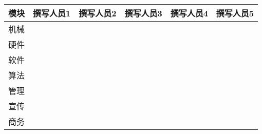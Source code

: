 \begin{longtable}{ X | X | X | X | X | X }

    \hline

    \endfoot
    
    \rowcolor{tabhdcolor}
    
        模块 &
        撰写人员1 &
        撰写人员2 &
        撰写人员3 &
        撰写人员4 &
        撰写人员5 \\
    
    \hline
    
    \endhead
    
        机械 &
        &
        &
        &
        &
        \\
    
    \hline
    
        硬件 &
        &
        &
        &
        &
        \\
    
    \hline
    
        软件 &
        &
        &
        &
        &
        \\
    
    \hline
        
        算法 &
        &
        &
        &
        &
        \\
    
    \hline
    
        管理 &
        &
        &
        &
        &
        \\
    
    \hline
    
        宣传 &
        &
        &
        &
        &
        \\
    
    \hline
    
        商务 &
        &
        &
        &
        &
        \\
    
    \hline
    
\end{longtable}